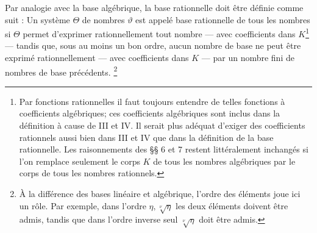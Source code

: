 Par analogie avec la base algébrique, la base rationnelle doit être définie comme suit : \og{} Un système $\Theta$ de nombres $\vartheta$ est appelé base rationnelle de tous les nombres si $\Theta$ permet d'exprimer rationnellement tout nombre --- avec coefficients dans $K$\footnote{Par fonctions rationnelles il faut toujours entendre de telles fonctions à coefficients algébriques; ces coefficients algébriques sont inclus dans la définition à cause de III et IV. Il serait plus adéquat d'exiger des coefficients rationnels aussi bien dans III et IV que dans la définition de la base rationnelle. Les raisonnements des \S{}\S{} 6 et 7 restent littéralement inchangés si l'on remplace seulement le corps $K$ de tous les nombres algébriques par le corps de tous les nombres rationnels.} --- tandis que, sous au moins un bon ordre, aucun nombre de base ne peut être exprimé rationnellement --- avec coefficients dans $K$ --- par un nombre fini de nombres de base précédents. \fg{}\footnote{À la différence des bases linéaire et algébrique, l'ordre des éléments joue ici un rôle. Par exemple, dans l'ordre $\eta,\sqrt[\nu]{\eta}$ les deux éléments doivent être admis, tandis que dans l'ordre inverse seul $\sqrt[\nu]{\eta}$ doit être admis.}

